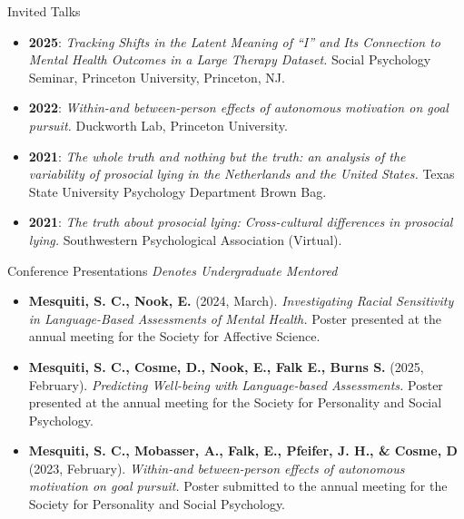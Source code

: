 \documentclass[
  11pt,
  ignorenonframetext,
]{beamer}
\providecommand{\tightlist}{%
  \setlength{\itemsep}{0pt}\setlength{\parskip}{0pt}}\usepackage{longtable,booktabs,array}
\begin{document}
\begin{frame}
\begin{block}{Invited Talks}
\label{invited-talks}
\begin{itemize}
\tightlist
\item
  \textbf{2025}: \emph{Tracking Shifts in the Latent Meaning of ``I''
  and Its Connection to Mental Health Outcomes in a Large Therapy
  Dataset.} Social Psychology Seminar, Princeton University, Princeton,
  NJ.
\item
  \textbf{2022}: \emph{Within-and between-person effects of autonomous
  motivation on goal pursuit.} Duckworth Lab, Princeton University.
\item
  \textbf{2021}: \emph{The whole truth and nothing but the truth: an
  analysis of the variability of prosocial lying in the Netherlands and
  the United States.} Texas State University Psychology Department Brown
  Bag.
\item
  \textbf{2021}: \emph{The truth about prosocial lying: Cross-cultural
  differences in prosocial lying.} Southwestern Psychological
  Association (Virtual).
\end{itemize}
\end{block}
\end{frame}

\begin{frame}
\begin{block}{Conference Presentations}
\label{conference-presentations}
\emph{Denotes Undergraduate Mentored}

\begin{itemize}
\tightlist
\item
  \textbf{Mesquiti, S. C., Nook, E.} (2024, March). \emph{Investigating
  Racial Sensitivity in Language-Based Assessments of Mental Health.}
  Poster presented at the annual meeting for the Society for Affective
  Science.
\item
  \textbf{Mesquiti, S. C., Cosme, D., Nook, E., Falk E., Burns S.}
  (2025, February). \emph{Predicting Well-being with Language-based
  Assessments.} Poster presented at the annual meeting for the Society
  for Personality and Social Psychology.
\item
  \textbf{Mesquiti, S. C., Mobasser, A., Falk, E., Pfeifer, J. H., \&
  Cosme, D} (2023, February). \emph{Within-and between-person effects of
  autonomous motivation on goal pursuit.} Poster submitted to the annual
  meeting for the Society for Personality and Social Psychology.
\end{itemize}
\end{block}
\end{frame}
\end{document}
